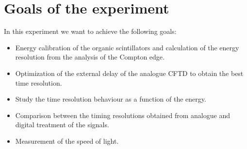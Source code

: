 \section*{Goals of the experiment}
In this experiment we want to achieve the following goals:

\begin{itemize}
\item Energy calibration of the organic scintillators and
calculation of the energy resolution from the analysis of
the Compton edge.
\item Optimization of the external delay of the analogue
CFTD to obtain the best time resolution.
\item Study the time resolution behaviour as a function of the
energy.
\item Comparison between the timing resolutions obtained
from analogue and digital treatment of the signals.
\item Measurement of the speed of light. 
\end{itemize}